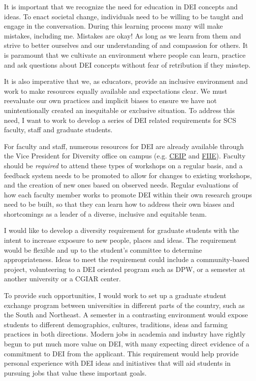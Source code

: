 \documentclass[11pt]{article}
\begin{document}
It is important that we recognize the need for education in DEI concepts and ideas. To enact societal change, individuals need to be willing to be taught and engage in the conversation. During this learning process many will make mistakes, including me. Mistakes are okay! As long as we learn from them and strive to better ourselves and our understanding of and compassion for others. It is paramount that we cultivate an environment where people can learn, practice and ask questions about DEI concepts without fear of retribution if they misstep. 

It is also imperative that we, as educators, provide an inclusive environment and work to make resources equally available and expectations clear. We must reevaluate our own practices and implicit biases to ensure we have not unintentionally created an inequitable or exclusive situation. To address this need, I want to work to develop a series of DEI related requirements for SCS faculty, staff and graduate students. 

For faculty and staff, numerous resources for DEI are already available through the Vice President for Diversity office on campus (e.g. \href{https://diversity.colostate.edu/our-programs/#1504017838903-86d3213a-2d2c}{CEIP} and \href{https://diversity.colostate.edu/our-programs/#1504017838952-75b4d525-fe10}{FIIE}). Faculty should be \emph{required} to attend these types of workshops on a regular basis, and a feedback system needs to be promoted to allow for changes to existing workshops, and the creation of new ones based on observed needs. Regular evaluations of how each faculty member works to promote DEI within their own research groups need to be built, so that they can learn how to address their own biases and shortcomings as a leader of a diverse, inclusive and equitable team.

I would like to develop a diversity requirement for graduate students with the intent to increase exposure to new people, places and ideas. The requirement would be flexible and up to the student's committee to determine appropriateness. Ideas to meet the requirement could include a community-based project, volunteering to a DEI oriented program such as DPW, or a semester at another university or a CGIAR center. 

To provide such opportunities, I would work to set up a graduate student exchange program between universities in different parts of the country, such as the South and Northeast. A semester in a contrasting environment would expose students to different demographics, cultures, traditions, ideas and farming practices in both directions. Modern jobs in academia and industry have rightly begun to put much more value on DEI, with many expecting direct evidence of a commitment to DEI from the applicant. This requirement would help provide personal experience with DEI ideas and initiatives that will aid students in pursuing jobs that value these important goals.
\end{document}

